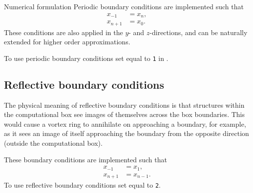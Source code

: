 \begin{chapter}{\label{cha:numerics}Numerical formulation}
  Periodic boundary conditions are implemented such that
  \begin{equation*}
    \begin{aligned}
      x_{-1}  &= x_{n}, \\
      x_{n+1} &= x_{0}.
    \end{aligned}
  \end{equation*}
  These conditions are also applied in the $y$- and $z$-directions, and can be
  naturally extended for higher order approximations.

  To use periodic boundary conditions set  equal to \verb"1" in
  .

  \subsection{Reflective boundary conditions}
  The physical meaning of reflective boundary conditions is that structures
  within the computational box see images of themselves across the box
  boundaries.  This would cause a vortex ring to annihilate on approaching a
  boundary, for example, as it sees an image of itself approaching the boundary
  from the opposite direction (outside the computational box).

  These boundary conditions are implemented such that
  \begin{equation*}
    \begin{aligned}
      x_{-1}  &= x_{1}, \\
      x_{n+1} &= x_{n-1}.
    \end{aligned}
  \end{equation*}
  To use reflective boundary conditions set  equal to \verb"2".
\end{chapter}
